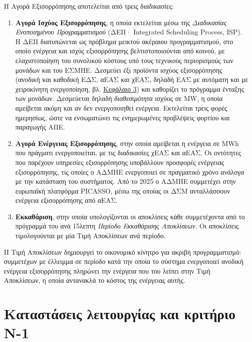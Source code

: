 

Η Αγορά Εξισορρόπησης αποτελείται από τρεις διαδικασίες:

\begin{enumerate}
\item \textbf{Αγορά Ισχύος Εξισορρόπησης}, η οποία εκτελείται μέσω της \emph{Διαδικασίας
      Ενοποιημένου Προγραμματισμού} (ΔΕΠ· Integrated Scheduling Process, ISP). Η ΔΕΠ
      διατυπώνεται ως πρόβλημα μεικτού ακέραιου προγραμματισμού, στο οποίο ενέργεια και ισχύς
      εξισορρόπησης βελτιστοποιούνται από κοινού, με ελαχιστοποίηση του συνολικού κόστους υπό
      τους τεχνικούς περιορισμούς των μονάδων και του ΕΣΜΗΕ. Δεσμεύει έξι προϊόντα ισχύος
      εξισορρόπησης (ανοδική και καθοδική ΕΔΣ, αΕΑΣ και χΕΑΣ, δηλαδή ΕΑΣ με αυτόματη και με
      χειροκίνητη ενεργοποίηση, βλ. \hyperref[kef-03-theoria]{Κεφάλαιο 3}) και καθορίζει το
      πρόγραμμα ένταξης των μονάδων. Δεσμεύεται δηλαδή \emph{διαθεσιμότητα} ισχύος σε MW, η
      οποία αμείβεται ακόμη και αν δεν ενεργοποιηθεί ενέργεια.
      Εκτελείται τρεις φορές ημερησίως, ώστε να ενσωματώνει τις ενημερωμένες προβλέψεις
      φορτίου και παραγωγής ΑΠΕ.
\item \textbf{Αγορά Ενέργειας Εξισορρόπησης}, στην οποία αμείβεται η ενέργεια σε MWh που
      πράγματι ενεργοποιείται, με τις διαδικασίες χΕΑΣ και αΕΑΣ. Οι οντότητες που παρέχουν υπηρεσίες εξισορρόπησης υποβάλλουν προσφορές ενέργειας εξισορρόπησης, τις
      οποίες ο ΑΔΜΗΕ ενεργοποιεί σε πραγματικό χρόνο ανάλογα με την κατάσταση του συστήματος.
      Από το 2025 ο ΑΔΜΗΕ συμμετέχει στην ευρωπαϊκή πλατφόρμα PICASSO, μέσω της οποίας οι ΔΣΜ
      ανταλλάσσουν ενέργεια εξισορρόπησης από αΕΑΣ.
\item \textbf{Εκκαθάριση}, στην οποία υπολογίζονται οι αποκλίσεις κάθε συμμετέχοντα από το
      πρόγραμμά του ανά 15λεπτη \emph{Περίοδο Εκκαθάρισης Αποκλίσεων}. Οι αποκλίσεις
      τιμολογούνται με μία Τιμή Αποκλίσεων ανά περίοδο.
\end{enumerate}

Η Τιμή Αποκλίσεων δημιουργεί το οικονομικό κίνητρο για ακριβή προγραμματισμό: συμμετέχων με
έλλειμμα σε περίοδο κατά την οποία το σύστημα ενεργοποιεί ανοδική ενέργεια εξισορρόπησης
πληρώνει την ενέργεια που του λείπει στην Τιμή Αποκλίσεων, η οποία αντανακλά το κόστος της
ενέργειας αυτής. 


\section{Καταστάσεις λειτουργίας και κριτήριο N-1}
\label{sec:states}

